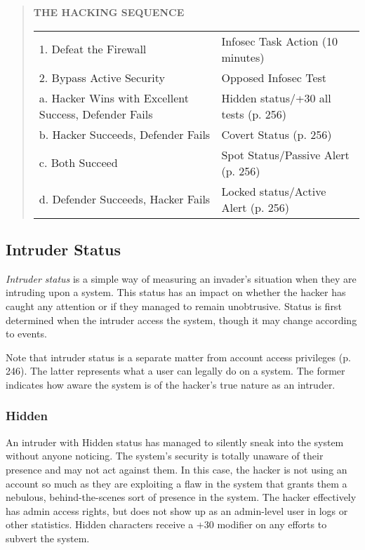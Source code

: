 \begin{quotation}
\textbf{THE HACKING SEQUENCE}

\begin{tabular}{ll}
1. Defeat the Firewall & Infosec Task Action (10 minutes) \\
2. Bypass Active Security & Opposed Infosec Test \\
\indent a. Hacker Wins with Excellent Success, Defender Fails & Hidden status/+30 all tests (p. 256) \\
\indent b. Hacker Succeeds, Defender Fails & Covert Status (p. 256) \\
\indent c. Both Succeed & Spot Status/Passive Alert (p. 256) \\
\indent d. Defender Succeeds, Hacker Fails & Locked status/Active Alert (p. 256) \\
\end{tabular}
\end{quotation}

\subsection{Intruder Status}

\textit{Intruder status} is a simple way of measuring an 
invader's situation when they are intruding upon 
a system. This status has an impact on whether the 
hacker has caught any attention or if they managed 
to remain unobtrusive. Status is first determined when 
the intruder access the system, though it may change 
according to events.

Note that intruder status is a separate matter from 
account access privileges (p. 246). The latter represents 
what a user can legally do on a system. The former 
indicates how aware the system is of the hacker's true 
nature as an intruder.

\subsubsection{Hidden}

An intruder with Hidden status has managed to silently
sneak into the system without anyone noticing. The
system's security is totally unaware of their presence 
and may not act against them. In this case, the hacker 
is not using an account so much as they are exploiting
a flaw in the system that grants them a nebulous,
behind-the-scenes sort of presence in the system. The 
hacker effectively has admin access rights, but does 
not show up as an admin-level user in logs or other 
statistics. Hidden characters receive a +30 modifier on 
any efforts to subvert the system.

